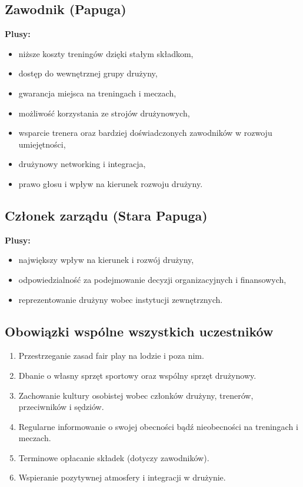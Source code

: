 \documentclass[12pt,a4paper]{article}
\begin{document}
\subsection{Zawodnik (Papuga)}
\textbf{Plusy:}
\begin{itemize}
    \item niższe koszty treningów dzięki stałym składkom,
    \item dostęp do wewnętrznej grupy drużyny,
    \item gwarancja miejsca na treningach i meczach,
    \item możliwość korzystania ze strojów drużynowych,
    \item wsparcie trenera oraz bardziej doświadczonych zawodników w rozwoju umiejętności,
    \item drużynowy networking i integracja,
    \item prawo głosu i wpływ na kierunek rozwoju drużyny.
\end{itemize}

\subsection{Członek zarządu (Stara Papuga)}
\textbf{Plusy:}
\begin{itemize}
    \item największy wpływ na kierunek i rozwój drużyny,
    \item odpowiedzialność za podejmowanie decyzji organizacyjnych i finansowych,
    \item reprezentowanie drużyny wobec instytucji zewnętrznych.
\end{itemize}

\subsection{Obowiązki wspólne wszystkich uczestników}
\begin{enumerate}
    \item Przestrzeganie zasad fair play na lodzie i poza nim.
    \item Dbanie o własny sprzęt sportowy oraz wspólny sprzęt drużynowy.
    \item Zachowanie kultury osobistej wobec członków drużyny, trenerów, przeciwników i sędziów.
    \item Regularne informowanie o swojej obecności bądź nieobecności na treningach i meczach.
    \item Terminowe opłacanie składek (dotyczy zawodników).
    \item Wspieranie pozytywnej atmosfery i integracji w drużynie.
\end{enumerate}
\end{document}
